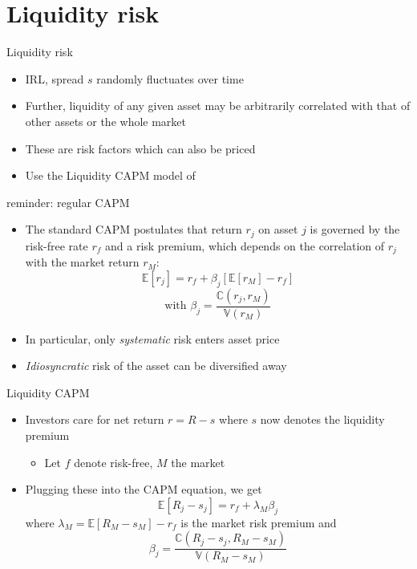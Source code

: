 \documentclass[english,10pt
,aspectratio=169
]{beamer}
\begin{document}
\section{Liquidity risk}

\begin{frame}{Liquidity risk}
	\begin{itemize}
		\item IRL, spread $s$ randomly fluctuates over time
		\item Further, liquidity of any given asset may be arbitrarily correlated with that of other assets or the whole market
		\item These are risk factors which can also be priced
		\item Use the Liquidity CAPM model of \cite{acharya_asset_2005}
	\end{itemize}
\end{frame}


\begin{frame}{reminder: regular CAPM}
	\begin{itemize}
		\item The standard CAPM postulates that return $r_j$ on asset $j$ is governed by the risk-free rate $r_f$ and a risk premium, which depends on the correlation of $r_j$ with the market return $r_M$:
		\begin{equation*}
			\mathbb{E}[r_j] = r_f + \beta_j \left[ \mathbb{E}[r_M] - r_f \right]
		\end{equation*}
		\begin{equation*}
			\text{with } \beta_j = \frac{\mathbb{C}(r_j, r_M)}{\mathbb{V}(r_M)}
		\end{equation*}
		\item In particular, only \emph{systematic} risk enters asset price
		\item \emph{Idiosyncratic} risk of the asset can be diversified away
	\end{itemize}
\end{frame}


\begin{frame}{Liquidity CAPM}
	\begin{itemize}
		\item Investors care for net return $r=R-s$ where $s$ now denotes the liquidity premium
		\begin{itemize}
			\item Let $f$ denote risk-free, $M$ the market
		\end{itemize}
		\item Plugging these into the CAPM equation, we get
		\[
		\mathbb{E}[R_j-s_j]=r_f + \lambda_M \beta_j
		\]
		where $\lambda_M = \mathbb{E}[R_M-s_M]-r_f$ is the market risk premium and
		\[
		\beta_j=\frac{\mathbb{C}(R_j-s_j, R_M-s_M)}{\mathbb{V}(R_M-s_M)}
		\]
	\end{itemize}
\end{frame}
\end{document}
